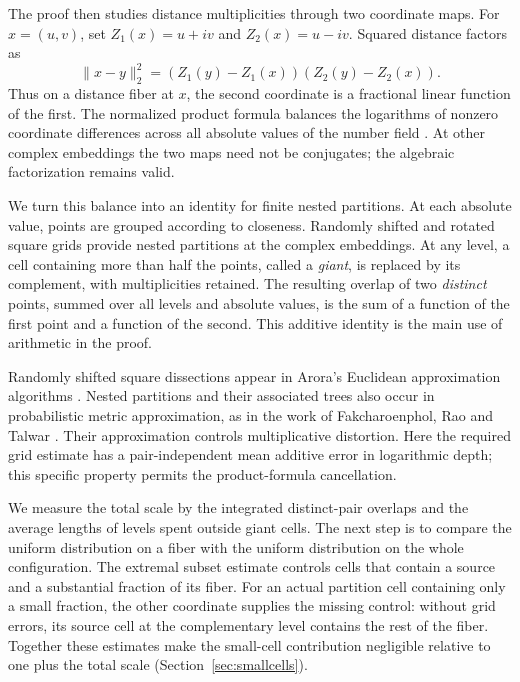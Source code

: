 The proof then studies distance multiplicities through two coordinate maps.
For $x=(u,v)$, set $Z_1(x)=u+iv$ and $Z_2(x)=u-iv$. Squared distance
factors as
\[
\lVert x-y\rVert_2^2
   =(Z_1(y)-Z_1(x))(Z_2(y)-Z_2(x)).
\]
Thus on a distance fiber at $x$, the second coordinate is a fractional
linear function of the first. The normalized product formula balances
the logarithms of nonzero coordinate differences across all absolute
values of the number field \cite[Theorem~7.15]{ProductFormula}.
At other complex embeddings the two maps need not be conjugates;
the algebraic factorization remains valid.

We turn this balance into an identity for finite nested partitions.
At each absolute value, points are grouped according to closeness.
Randomly shifted and rotated square grids provide nested partitions
at the complex embeddings. At any level, a cell containing more than
half the points, called a \emph{giant}, is replaced by its complement,
with multiplicities retained. The resulting overlap of two
\emph{distinct} points, summed
over all levels and absolute values, is the sum of a function of the
first point and a function of the second. This additive identity is
the main use of arithmetic in the proof.

Randomly shifted square dissections appear in Arora's Euclidean
approximation algorithms \cite[Section~2.1]{Arora1998}.
Nested partitions and their associated trees also occur in probabilistic
metric approximation, as in the work of Fakcharoenphol, Rao and Talwar
\cite{FakcharoenpholRaoTalwar2003}. Their approximation controls
multiplicative distortion. Here the required grid estimate has a
pair-independent mean additive error in logarithmic depth; this
specific property permits the product-formula cancellation.

We measure the total scale by the integrated distinct-pair overlaps
and the average lengths of levels spent outside giant cells.
The next step is to compare the uniform distribution on a fiber with
the uniform distribution on the whole configuration. The extremal
subset estimate controls cells that contain a source and a substantial
fraction of its fiber. For an actual partition cell containing only a
small fraction, the other coordinate supplies the missing control: without grid
errors, its source cell at the complementary level contains the rest
of the fiber. Together these estimates make the small-cell contribution
negligible relative to one plus the total scale
(Section~\ref{sec:smallcells}).

